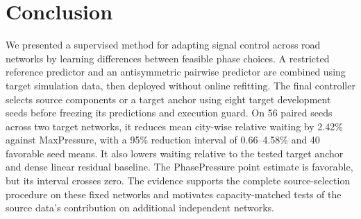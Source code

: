 \section{Conclusion}
We presented a supervised method for adapting signal control across road networks by learning differences between feasible phase choices. A restricted reference predictor and an antisymmetric pairwise predictor are combined using target simulation data, then deployed without online refitting. The final controller selects source components or a target anchor using eight target development seeds before freezing its predictions and execution guard. On 56 paired seeds across two target networks, it reduces mean city-wise relative waiting by 2.42\% against MaxPressure, with a 95\% reduction interval of 0.66--4.58\% and 40 favorable seed means. It also lowers waiting relative to the tested target anchor and dense linear residual baseline. The PhasePressure point estimate is favorable, but its interval crosses zero. The evidence supports the complete source-selection procedure on these fixed networks and motivates capacity-matched tests of the source data's contribution on additional independent networks.
